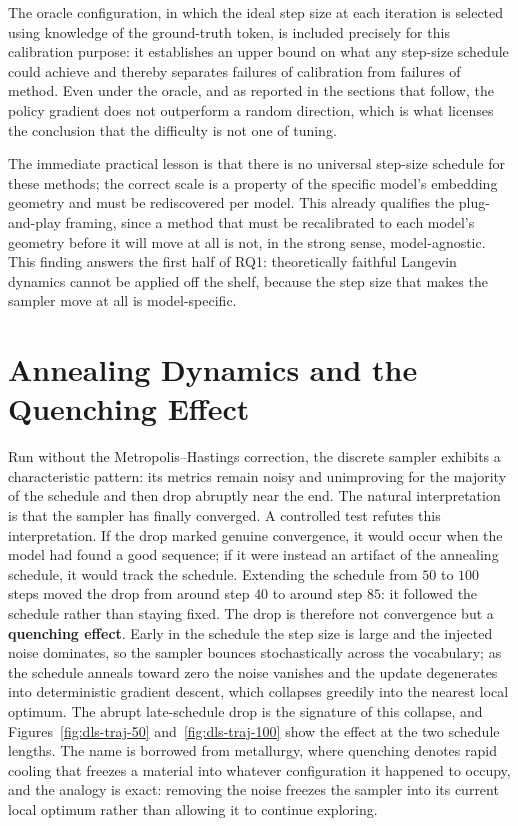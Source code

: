 The oracle configuration, in which the ideal step size at each iteration is selected using knowledge of the ground-truth token, is included precisely for this calibration purpose: it establishes an upper bound on what any step-size schedule could achieve and thereby separates failures of calibration from failures of method. Even under the oracle, and as reported in the sections that follow, the policy gradient does not outperform a random direction, which is what licenses the conclusion that the difficulty is not one of tuning.

The immediate practical lesson is that there is no universal step-size schedule for these methods; the correct scale is a property of the specific model's embedding geometry and must be rediscovered per model. This already qualifies the plug-and-play framing, since a method that must be recalibrated to each model's geometry before it will move at all is not, in the strong sense, model-agnostic. This finding answers the first half of RQ1: theoretically faithful Langevin dynamics cannot be applied off the shelf, because the step size that makes the sampler move at all is model-specific.

\section{Annealing Dynamics and the Quenching Effect}
\label{sec:results-quench}

Run without the Metropolis--Hastings correction, the discrete sampler exhibits a characteristic pattern: its metrics remain noisy and unimproving for the majority of the schedule and then drop abruptly near the end. The natural interpretation is that the sampler has finally converged. A controlled test refutes this interpretation. If the drop marked genuine convergence, it would occur when the model had found a good sequence; if it were instead an artifact of the annealing schedule, it would track the schedule. Extending the schedule from $50$ to $100$ steps moved the drop from around step $40$ to around step $85$: it followed the schedule rather than staying fixed.
The drop is therefore not convergence but a \textbf{quenching effect}. Early in the schedule the step size is large and the injected noise dominates, so the sampler bounces stochastically across the vocabulary; as the schedule anneals toward zero the noise vanishes and the update degenerates into deterministic gradient descent, which collapses greedily into the nearest local optimum. The abrupt late-schedule drop is the signature of this collapse, and Figures~\ref{fig:dls-traj-50} and~\ref{fig:dls-traj-100} show the effect at the two schedule lengths. The name is borrowed from metallurgy, where quenching denotes rapid cooling that freezes a material into whatever configuration it happened to occupy, and the analogy is exact: removing the noise freezes the sampler into its current local optimum rather than allowing it to continue exploring.

